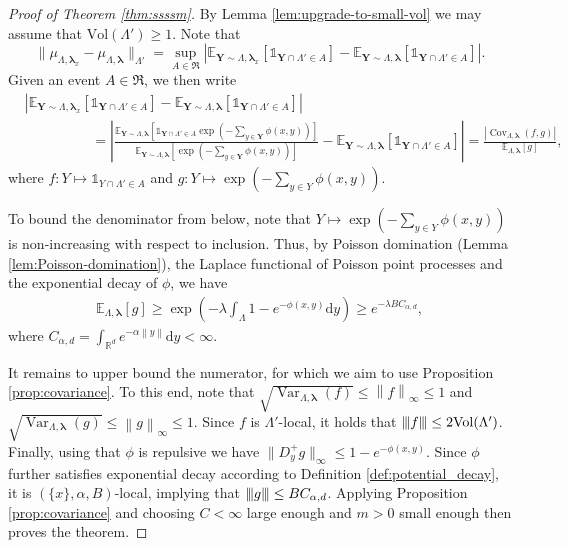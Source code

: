 \documentclass[10pt]{amsart}
\theoremstyle{definition}
\theoremstyle{remark}
\newcommand{\events}{\mathfrak{R}}
\newcommand{\ind}[1]{\mathds{1}_{#1}}
\newcommand{\tnorm}[1]{{\left\vert\kern-0.25ex\left\vert\kern-0.25ex\left\vert #1 
		\right\vert\kern-0.25ex\right\vert\kern-0.25ex\right\vert}}
\newcommand{\bY}{\mathbf{Y}}
\newcommand{\E}{\mathbb{E}}
\newcommand{\R}{\mathbb{R}}
\newcommand{\region}{\Lambda}
\newcommand{\potential}{\phi}
\newcommand{\activity}{\lambda}
\newcommand{\activities}{\pmb{\lambda}}
\newcommand{\diff}{\mathrm{d}}
\newcommand{\vol}{\mathrm{Vol}}
\newcommand{\norm}[1]{\left\lVert#1\right\rVert}
\newcommand{\absolute}[1]{\left\lvert#1\right\rvert}
\newcommand{\Var}{{\operatorname{Var}}}
\newcommand{\Cov}{\operatorname{Cov}}
\begin{document}
	
	\begin{proof}[Proof of Theorem \ref{thm:ssssm}]
		By Lemma \ref{lem:upgrade-to-small-vol} we may assume that $\vol(\Lambda') \geq 1$.  
		Note that
		\[
		\|{\mu_{\region, \activities_x} - \mu_{\region, \activities}}\|_{\region'} = \sup_{A \in \events} \absolute{\E_{\bY \sim \region, \activities_x}[\ind{\bY \cap \region' \in A}] - \E_{\bY \sim \region, \activities}[\ind{\bY \cap \region' \in A}]} .
		\]
		Given an event $A \in \events$, we then write
		\begin{align*}
			&\absolute{\E_{\bY \sim \region, \activities_x}[\ind{\bY \cap \region' \in A}] - \E_{\bY \sim \region, \activities}[\ind{\bY \cap \region' \in A}]} 
			\\ &\hspace{2cm}= \absolute{\frac{\E_{\bY \sim \region, \activities}[\ind{\bY \cap \region' \in A}  \exp(-\sum_{y \in \bY} \potential(x, y))]}{\E_{\bY \sim \region, \activities}[\exp(-\sum_{y \in \bY} \potential(x, y))]} - \E_{\bY \sim \region, \activities}[\ind{\bY \cap \region' \in A}]} = \frac{\absolute{\Cov_{\region, \activities}(f, g)}}{\E_{\region, \activities}[g]} ,
		\end{align*}
		where $f: Y \mapsto \ind{Y \cap \region' \in A}$ and $g: Y \mapsto \exp(-\sum_{y \in Y} \potential(x, y))$.
		
		To bound the denominator from below, note that $Y \mapsto \exp(-\sum_{y \in Y} \potential(x, y))$ is non-increasing with respect to inclusion.
		Thus, by Poisson domination (Lemma \ref{lem:Poisson-domination}), the Laplace functional of Poisson point processes and the exponential decay of $\potential$, we have
		\begin{align}\label{eq:lower-bound-exponential-added-energy}
			\E_{\region, \activities}[g]
			\ge \exp\left( - \activity \int_{\region} 1 - e^{-\potential(x, y)} \diff y\right)
			\ge e^{-\activity  B  C_{\alpha, d}} ,
		\end{align}
		where $C_{\alpha, d} = \int_{\R^d} e^{-\alpha  \norm{y}} \diff y < \infty$.
		
		It remains to upper bound the numerator, for which we aim to use Proposition \ref{prop:covariance}.
		To this end, note that $\sqrt{\Var_{\region,\activities}(f)}  \le \norm{f}_{\infty} \le 1$ and $\sqrt{\Var_{\region,\activities}(g)}  \le \norm{g}_{\infty} \le 1$.
		Since $f$ is $\region'$-local, it holds that $\tnorm{f} \le 2 \vol(\region')$.
		Finally, using that $\potential$ is repulsive we have $\|D^+_y g\|_\infty \le 1 - e^{-\potential(x, y)}$.
		Since $\potential$ further satisfies exponential decay according to Definition \ref{def:potential_decay}, it is $(\{x\}, \alpha, B)$-local, implying that  $\tnorm{g} \le B  C_{\alpha, d}$.
		Applying Proposition \ref{prop:covariance} and choosing $C < \infty$ large enough and $m > 0$ small enough then proves the theorem.
	\end{proof}
	
\end{document}
